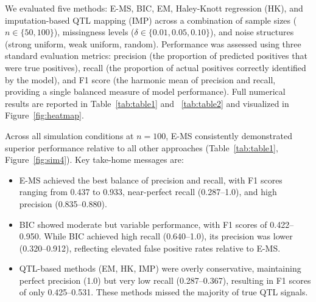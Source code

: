 \documentclass[
  12pt,
]{article}
\begin{document}
We evaluated five methods: E-MS, BIC, EM, Haley-Knott regression (HK), and imputation-based QTL mapping (IMP) across a combination of sample sizes ($n \in \{50, 100\}$), missingness levels ($\delta \in \{0.01, 0.05, 0.10\}$), and noise structures (strong uniform, weak uniform, random).
Performance was assessed using three standard evaluation metrics: precision (the proportion of predicted positives that were true positives), recall (the proportion of actual positives correctly identified by the model), and F1 score (the harmonic mean of precision and recall, providing a single balanced measure of model performance). 
Full numerical results are reported in Table~\ref{tab:table1} and ~\ref{tab:table2}
and visualized in Figure~\ref{fig:heatmap}.


Across all simulation conditions at $n = 100$, E-MS consistently 
demonstrated superior performance relative to all other approaches 
(Table~\ref{tab:table1}, Figure~\ref{fig:sim4}). Key take-home messages are:

\begin{itemize}
    \item E-MS achieved the best balance of precision and recall, 
    with F1 scores ranging from 0.437 to 0.933, near-perfect recall 
    (0.287--1.0), and high precision (0.835--0.880).

    \item BIC showed moderate but variable performance, with F1 
    scores of 0.422--0.950. While BIC achieved high recall (0.640--1.0), 
    its precision was lower (0.320--0.912), reflecting elevated false 
    positive rates relative to E-MS.

    \item QTL-based methods (EM, HK, IMP) were overly conservative, 
    maintaining perfect precision (1.0) but very low recall (0.287--0.367), 
    resulting in F1 scores of only 0.425--0.531. These methods missed the 
    majority of true QTL signals.
\end{itemize}

\end{document}
